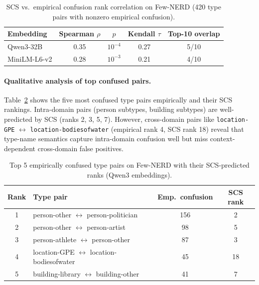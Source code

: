 \documentclass[11pt,a4paper]{article}
\begin{document}
\begin{table}[t]
\centering
\caption{SCS vs.\ empirical confusion rank correlation on Few-NERD (420 type pairs with nonzero empirical confusion).}
\label{tab:scs-validation}
\begin{tabular}{lcccc}
\toprule
\textbf{Embedding} & \textbf{Spearman $\rho$} & \textbf{$p$} & \textbf{Kendall $\tau$} & \textbf{Top-10 overlap} \\
\midrule
Qwen3-32B   & 0.35 & $10^{-4}$ & 0.27 & 5/10 \\
MiniLM-L6-v2 & 0.28 & $10^{-3}$ & 0.21 & 4/10 \\
\bottomrule
\end{tabular}
\end{table}

\paragraph{Qualitative analysis of top confused pairs.}
Table~\ref{tab:top-pairs} shows the five most confused type pairs empirically and their SCS rankings. Intra-domain pairs (person subtypes, building subtypes) are well-predicted by SCS (ranks 2, 3, 5, 7). However, cross-domain pairs like \texttt{location-GPE} $\leftrightarrow$ \texttt{location-bodiesofwater} (empirical rank 4, SCS rank 18) reveal that type-name semantics capture intra-domain confusion well but miss context-dependent cross-domain false positives.

\begin{table}[t]
\centering
\caption{Top 5 empirically confused type pairs on Few-NERD with their SCS-predicted ranks (Qwen3 embeddings).}
\label{tab:top-pairs}
\begin{tabular}{clcc}
\toprule
\textbf{Rank} & \textbf{Type pair} & \textbf{Emp.\ confusion} & \textbf{SCS rank} \\
\midrule
1 & person-other $\leftrightarrow$ person-politician & 156 & 2 \\
2 & person-other $\leftrightarrow$ person-artist     & 98  & 5 \\
3 & person-athlete $\leftrightarrow$ person-other     & 87  & 3 \\
4 & location-GPE $\leftrightarrow$ location-bodiesofwater & 45 & 18 \\
5 & building-library $\leftrightarrow$ building-other & 41  & 7 \\
\bottomrule
\end{tabular}
\end{table}
\end{document}
